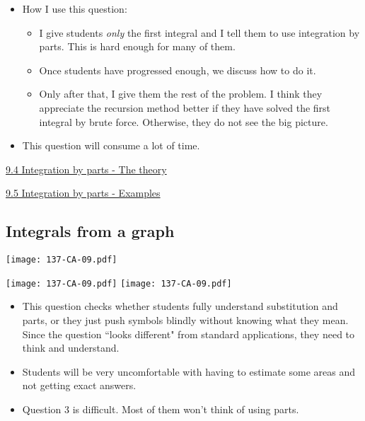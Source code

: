 \documentclass[11pt]{article}
\newcommand{\nl}{\hfill \vspace{-1.1\baselineskip}} %
\newcommand{\viv}{\hspace{8mm} \href{https://www.youtube.com/watch?v=taKIe3Ui3oI&list=PLlwePzQY_wW_DPAQSBjQmMs0hF8T7yVkF&index=4}{9.4 Integration by parts - The theory}}
\newcommand{\vv}{\hspace{8mm} \href{https://www.youtube.com/watch?v=15DJgDvMpTE&list=PLlwePzQY_wW_DPAQSBjQmMs0hF8T7yVkF&index=5}{9.5 Integration by parts - Examples}}
\begin{document}
\begin{comments}
\nl
	\begin{itemize}
		\item   How I use this question:
			\begin{itemize}
				\item  I give students \emph{only} the first integral and I tell them to use integration by parts.  This is hard enough for many of them. 
				\item Once students have progressed enough, we discuss how to do it.
				\item Only after that, I give them the rest of the problem.  I think they appreciate the recursion method better if they have solved the first integral by brute force.  Otherwise, they do not see the big picture.
			\end{itemize}
		\item This question will consume a lot of time.
	\end{itemize}
\end{comments}

\begin{videos}
\viv

\vv
\end{videos}

\newpage
\subsection{Integrals from a graph}

\begin{center}
{ \texttt{[image: 137-CA-09.pdf]}} 

{ \texttt{[image: 137-CA-09.pdf]}}  \quad
{ \texttt{[image: 137-CA-09.pdf]}} 

\end{center}

\begin{comments}
\nl
	\begin{itemize}
		\item This question checks whether students fully understand substitution and parts, or they just push symbols blindly without knowing what they mean.  Since the question ``looks different" from standard applications, they need to think and understand.
		\item Students will be very uncomfortable with having to estimate some areas and not getting exact answers.
		\item Question 3 is difficult. Most of them won't think of using parts.
	\end{itemize}
\end{comments}
\end{document}
